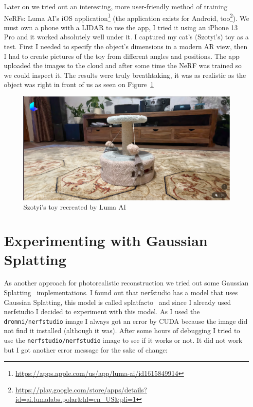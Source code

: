 Later on we tried out an interesting, more user-friendly method of training NeRFs: Luma AI's iOS application\footnote{\url{https://apps.apple.com/us/app/luma-ai/id1615849914}} (the application exists for Android, too\footnote{\url{https://play.google.com/store/apps/details?id=ai.lumalabs.polar&hl=en_US&pli=1}}). We must own a phone with a LIDAR to use the app, I tried it using an iPhone 13 Pro and it worked absolutely well under it. I captured my cat's (Szotyi's) toy as a test. First I needed to specify the object's dimensions in a modern AR view, then I had to create pictures of the toy from different angles and positions. The app uploaded the images to the cloud and after some time the NeRF was trained so we could inspect it. The results were truly breathtaking, it was as realistic as the object was right in front of us as seen on Figure~\ref{fig:luma_ai_szotyi_toy}

\begin{figure}[htbp]
	\centering
	\includegraphics[width=150mm, keepaspectratio]{figures/szotyi_jateka_luma_ai.png}
	\caption{Szotyi's toy recreated by Luma AI}
	\label{fig:luma_ai_szotyi_toy}
\end{figure}

\section{Experimenting with Gaussian Splatting}

As another approach for photorealistic reconstruction we tried out some Gaussian Splatting~\cite{3DGS} implementations. I found out that nerfstudio has a model that uses Gaussian Splatting, this model is called splatfacto~\cite{splatfacto} and since I already used nerfstudio I decided to experiment with this model. As I used the \verb|dromni/nerfstudio| image I always got an error by CUDA because the image did not find it installed (although it was). After some hours of debugging I tried to use the \verb|nerfstudio/nerfstudio| image to see if it works or not. It did not work but I got another error message for the sake of change:

